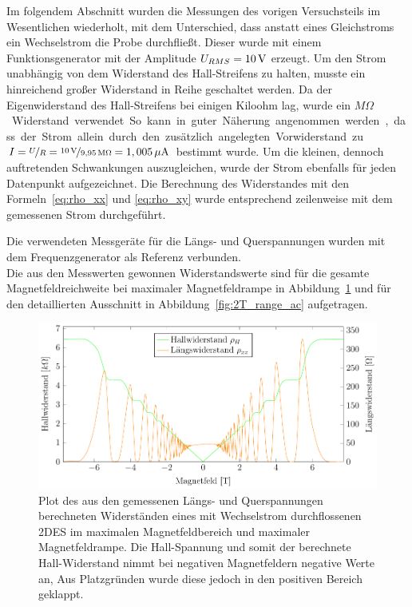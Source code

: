 
Im folgendem Abschnitt wurden die Messungen des vorigen Versuchsteils im Wesentlichen wiederholt, mit dem Unterschied, dass anstatt eines Gleichstroms ein Wechselstrom die Probe durchfließt. 
Dieser wurde mit einem Funktionsgenerator mit der Amplitude $U_{RMS}=\unit[10]{V}$ erzeugt. Um den Strom unabhängig von dem Widerstand des Hall-Streifens zu halten, musste ein hinreichend großer Widerstand in Reihe geschaltet werden. Da der Eigenwiderstand des Hall-Streifens bei einigen Kiloohm lag, wurde ein \unit[9,95]{$M\Omega$} Widerstand verwendet. So kann in guter Näherung angenommen werden, dass der Strom allein durch den zusätzlich angelegten Vorwiderstand zu $I=\nicefrac{U}{R}=\nicefrac{\unit[10]{V}}{\unit[9,95]{M\Omega}}=\unit[1,005]{\mu A}$ bestimmt wurde. Um die kleinen, dennoch auftretenden Schwankungen auszugleichen, wurde der Strom ebenfalls für jeden Datenpunkt aufgezeichnet. Die Berechnung des Widerstandes mit den Formeln~\eqref{eq:rho_xx} und \eqref{eq:rho_xy} wurde entsprechend zeilenweise mit dem gemessenen Strom durchgeführt.

Die verwendeten Messgeräte für die Längs- und Querspannungen wurden mit dem Frequenzgenerator als Referenz verbunden. %
\\

Die aus den Messwerten gewonnen Widerstandswerte sind für die gesamte Magnetfeldreichweite bei maximaler Magnetfeldrampe in Abbildung~\ref{fig:full_range_ac} und für den detaillierten Ausschnitt in Abbildung~\ref{fig:2T_range_ac} aufgetragen.

\begin{figure}[h]
	\centering
	\includegraphics{graphs/ac/full_range.pdf}
	\caption[Wechselstrommessung im maximalen Magnetfeldbereich]{
		Plot des aus den gemessenen Längs- und Querspannungen berechneten Widerständen eines mit Wechselstrom durchflossenen 2DES im maximalen Magnetfeldbereich und maximaler Magnetfeldrampe. Die Hall-Spannung und somit der berechnete Hall-Widerstand nimmt bei negativen Magnetfeldern negative Werte an, Aus Platzgründen wurde diese jedoch in den positiven Bereich geklappt.
	}
	\label{fig:full_range_ac}
\end{figure}

